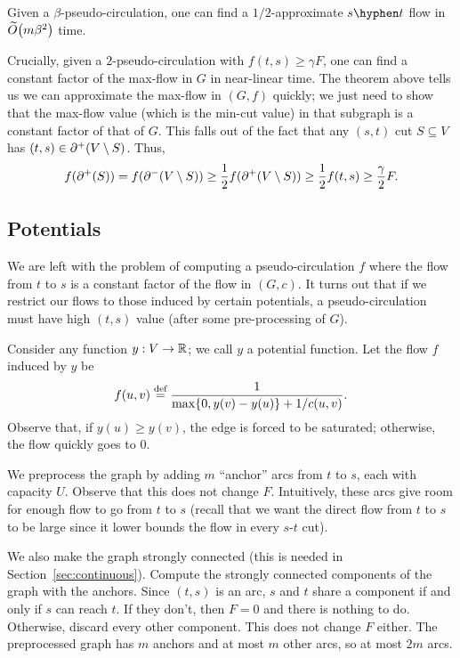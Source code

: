 \documentclass[12pt]{article}
\begin{document}
\begin{theorem}
  Given a $\beta$-pseudo-circulation, one can find a $1/2$-approximate
  $s \hyphen t$ flow in $\apxO{m\beta^2}$ time.
\end{theorem}

Crucially, given a $2$-pseudo-circulation with $f(t, s) \geq \gamma F$, one can
find a constant factor of the max-flow in $G$ in near-linear time. The theorem
above tells us we can approximate the max-flow in $(G, f)$ quickly; we just need
to show that the max-flow value (which is the min-cut value) in that subgraph is
a constant factor of that of $G$. This falls out of the fact that any $(s, t)$
cut $S \subseteq V$ has $(t, s) \in \outcut{V \setminus S}$. Thus,
\[
  f(\outcut{S}) =    f(\incut{V \setminus S})
                \geq \frac{1}{2}f(\outcut{V \setminus S})
                \geq \frac{1}{2}f(t, s)
                \geq \frac{\gamma}{2}F.
\]

\subsection{Potentials}

We are left with the problem of computing a pseudo-circulation $f$ where the
flow from $t$ to $s$ is a constant factor of the flow in $(G, c)$. It turns out
that if we restrict our flows to those induced by certain potentials, a
pseudo-circulation must have high $(t, s)$ value (after some pre-processing of
$G$).

Consider any function $y : V \to \mathbb{R}$; we call $y$ a potential function. Let the
flow $f$ induced by $y$ be
\[
  f(u, v) \defeq \frac{1}{\max\Set{0, y(v) - y(u)} + 1/c(u, v)}.
\]
Observe that, if $y(u) \geq y(v)$, the edge is forced to be saturated;
otherwise, the flow quickly goes to $0$.

We preprocess the graph by adding $m$ ``anchor'' arcs from $t$ to $s$, each with
capacity $U$. Observe that this does not change $F$. Intuitively, these arcs
give room for enough flow to go from $t$ to $s$ (recall that we want the direct
flow from $t$ to $s$ to be large since it lower bounds the flow in every $s$-$t$
cut).

We also make the graph strongly connected (this is needed in
Section~\ref{sec:continuous}). Compute the strongly connected components of the
graph with the anchors. Since $(t, s)$ is an arc, $s$ and $t$ share a component
if and only if $s$ can reach $t$. If they don't, then $F = 0$ and there is
nothing to do. Otherwise, discard every other component. This does not change
$F$ either. The preprocessed graph has $m$ anchors and at most $m$ other arcs,
so at most $2m$ arcs.
\end{document}
